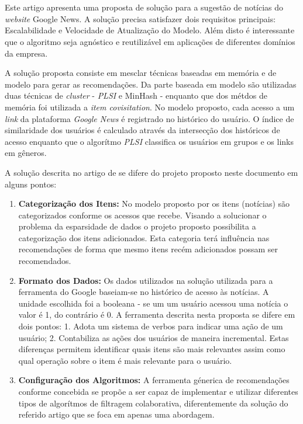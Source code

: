 \documentclass[
	12pt,				%
    oneside,			%
	a4paper,			%
	english,			%
	french,				%
	spanish,			%
	brazil,				%
	]{abntex2}
\begin{document}
\section{}
Este artigo apresenta uma proposta de solução para a sugestão de notícias do \textit{website} Google News. A solução precisa satisfazer dois requisitos principais:
Escalabilidade e Velocidade de Atualização do Modelo. Além disto é interessante que o algoritmo seja agnóstico e reutilizável em aplicações de diferentes domínios 
da empresa.

A solução proposta consiste em mesclar técnicas baseadas em memória e de modelo para gerar as recomendações. Da parte baseada em modelo são utilizadas duas técnicas
de \textit{cluster} - \textit{PLSI} e MinHash - enquanto que dos métdos de memória foi utilizada a \textit{item covisitation}. No modelo proposto, cada acesso a um 
\textit{link} da plataforma \textit{Google News} é registrado no histórico do usuário. O índice de similaridade dos usuários é calculado através da intersecção dos
históricos de acesso enquanto que o algorítmo \textit{PLSI} classifica os usuários em grupos e os links em gêneros.

A solução descrita no artigo de  se difere do projeto proposto neste documento em alguns pontos:

\begin{enumerate}
	\item \textbf{Categorização dos Itens:} No modelo proposto por  os itens (notícias) são categorizados conforme os acessos que recebe. Visando a solucionar
	o problema da esparsidade de dados o projeto proposto possibilita a categorização dos itens adicionados. Esta categoria terá influência nas recomendações de forma que mesmo itens recém adicionados
	possam ser recomendados.
	\item \textbf{Formato dos Dados:} Os dados utilizados na solução utilizada para a ferramenta do Google baseiam-se no histórico de acesso às notícias. A unidade escolhida foi a booleana - se um
	um usuário acessou uma notícia o valor é 1, do contrário é 0. A ferramenta descrita nesta proposta se difere em dois pontos: 1. Adota um sistema de verbos para indicar uma ação de um usuário;
	2. Contabiliza as ações dos usuários de maneira incremental. Estas diferenças permitem identificar quais itens são mais relevantes assim como qual operação sobre o item é mais relevante para o usuário.
	\item \textbf{Configuração dos Algoritmos:} A ferramenta génerica de recomendações conforme concebida se propõe a ser capaz de implementar e utilizar diferentes tipos de algorítmos de filtragem colaborativa,
	diferentemente da solução do referido artigo que se foca em apenas uma abordagem.
\end{enumerate}
\end{document}
